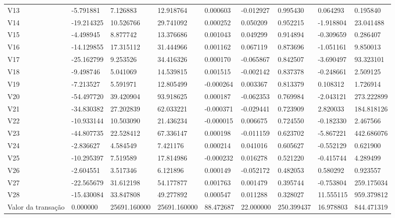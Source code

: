 \begin{longtable}{lllllllll}
V13 & -5.791881 & 7.126883 & 12.918764 & 0.000603 & -0.012927 & 0.995430 & 0.064293 & 0.195840 \\
V14 & -19.214325 & 10.526766 & 29.741092 & 0.000252 & 0.050209 & 0.952215 & -1.918804 & 23.041488 \\
V15 & -4.498945 & 8.877742 & 13.376686 & 0.001043 & 0.049299 & 0.914894 & -0.309659 & 0.286407 \\
V16 & -14.129855 & 17.315112 & 31.444966 & 0.001162 & 0.067119 & 0.873696 & -1.051161 & 9.850013 \\
V17 & -25.162799 & 9.253526 & 34.416326 & 0.000170 & -0.065867 & 0.842507 & -3.690497 & 93.323101 \\
V18 & -9.498746 & 5.041069 & 14.539815 & 0.001515 & -0.002142 & 0.837378 & -0.248661 & 2.509125 \\
V19 & -7.213527 & 5.591971 & 12.805499 & -0.000264 & 0.003367 & 0.813379 & 0.108312 & 1.726914 \\
V20 & -54.497720 & 39.420904 & 93.918625 & 0.000187 & -0.062353 & 0.769984 & -2.043121 & 273.222899 \\
V21 & -34.830382 & 27.202839 & 62.033221 & -0.000371 & -0.029441 & 0.723909 & 2.820033 & 184.818126 \\
V22 & -10.933144 & 10.503090 & 21.436234 & -0.000015 & 0.006675 & 0.724550 & -0.182330 & 2.467566 \\
V23 & -44.807735 & 22.528412 & 67.336147 & 0.000198 & -0.011159 & 0.623702 & -5.867221 & 442.686076 \\
V24 & -2.836627 & 4.584549 & 7.421176 & 0.000214 & 0.041016 & 0.605627 & -0.552129 & 0.621900 \\
V25 & -10.295397 & 7.519589 & 17.814986 & -0.000232 & 0.016278 & 0.521220 & -0.415744 & 4.289499 \\
V26 & -2.604551 & 3.517346 & 6.121896 & 0.000149 & -0.052172 & 0.482053 & 0.580292 & 0.923557 \\
V27 & -22.565679 & 31.612198 & 54.177877 & 0.001763 & 0.001479 & 0.395744 & -0.753804 & 259.175034 \\
V28 & -15.430084 & 33.847808 & 49.277892 & 0.000547 & 0.011288 & 0.328027 & 11.555115 & 959.379812 \\
Valor da transação & 0.000000 & 25691.160000 & 25691.160000 & 88.472687 & 22.000000 & 250.399437 & 16.978803 & 844.471319 \\
\end{longtable}
